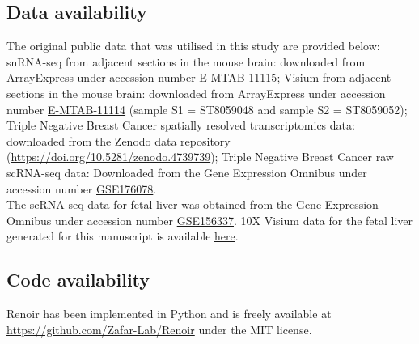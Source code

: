 \subsection*{Data availability}
The original public data that was utilised in this study are provided below: snRNA-seq from adjacent sections in the mouse brain: downloaded from ArrayExpress under accession number \href{https://www.ebi.ac.uk/biostudies/arrayexpress/studies/E-MTAB-11115}{E-MTAB-11115}; Visium from adjacent sections in the mouse brain: downloaded from ArrayExpress under accession number \href{https://www.ebi.ac.uk/biostudies/arrayexpress/studies/E-MTAB-11114}{E-MTAB-11114} (sample S1 = ST8059048 and sample S2 = ST8059052); Triple Negative Breast Cancer spatially resolved transcriptomics data: downloaded from the Zenodo data repository (\href{https://doi.org/10.5281/zenodo.4739739}{https://doi.org/10.5281/zenodo.4739739}); Triple Negative Breast Cancer raw scRNA-seq data: Downloaded from the Gene Expression Omnibus under accession number \href{https://www.ncbi.nlm.nih.gov/geo/query/acc.cgi?acc=GSE176078}{GSE176078}.\\
The scRNA-seq data for fetal liver was obtained from the Gene Expression Omnibus under accession number \href{https://www.ncbi.nlm.nih.gov/geo/query/acc.cgi?acc=GSE156337}{GSE156337}. 10X Visium data for the fetal liver generated for this manuscript is available  \href{https://www.dropbox.com/sh/2x06xssp4o3z13a/AACr9IgoNWgTmRvkYPqzVKf5a?dl=0}{here}.

\subsection*{Code availability}
Renoir has been implemented in Python and is freely available at \href{https://github.com/Zafar-Lab/Renoir}{https://github.com/Zafar-Lab/Renoir} under the MIT license.